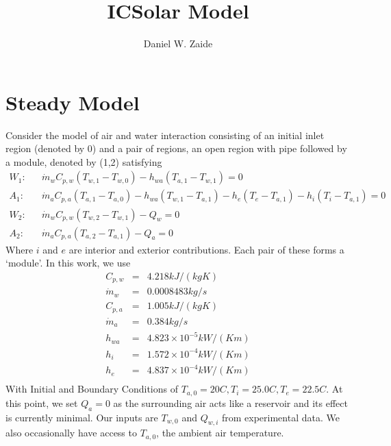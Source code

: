 \documentclass[11pt]{article}
\title{ICSolar Model}
\author{Daniel W. Zaide}
\begin{document}
\maketitle
\section{Steady Model}

Consider the model of air and water interaction consisting of an initial inlet region (denoted by 0) and a pair of regions, an open region with pipe followed by a module, denoted by (1,2) satisfying 
\begin{eqnarray} 
W_1: & & \dot{m}_wC_{p,w}(T_{w,1}-T_{w,0}) - h_{wa}(T_{a,1}-T_{w,1}) = 0 \\
A_1: & & \dot{m}_aC_{p,a}(T_{a,1}-T_{a,0}) - h_{wa}(T_{w,1}-T_{a,1}) - h_{e}(T_e-T_{a,1}) - h_{i}(T_i-T_{a,1})= 0 \\
W_2: & & \dot{m}_wC_{p,w}(T_{w,2}-T_{w,1}) - Q_w = 0\\
A_2: & & \dot{m}_aC_{p,a}(T_{a,2}-T_{a,1}) - Q_a = 0 
\label{eq:steady}
\end{eqnarray}
Where $i$ and $e$ are interior and exterior contributions. Each pair of these forms a `module'. In this work, we use
\begin{eqnarray}
C_{p,w} & = & 4.218 kJ/(kg K) \\
\dot{m}_w & = & 0.0008483 kg/s \\
C_{p,a} & = & 1.005 kJ/(kg K) \\
\dot{m}_a & = & 0.384 kg/s \\
h_{wa} & = & 4.823 \times 10^{-5} kW/(K m)\\
h_{i} & = & 1.572 \times 10^{-4} kW/(K m)\\
h_{e} & = & 4.837 \times 10^{-4} kW/(K m)\\
\end{eqnarray}
With Initial and Boundary Conditions of $T_{a,0} = 20 C, T_i = 25.0 C, T_e = 22.5 C$. At this point, we set $Q_a = 0$ as the surrounding air acts like a reservoir and its effect is currently minimal. Our inputs are $T_{w,0}$ and $Q_{w,i}$ from experimental data. We also occasionally have access to $T_{a,0}$, the ambient air temperature. 
\clearpage
\newpage 
\end{document}
